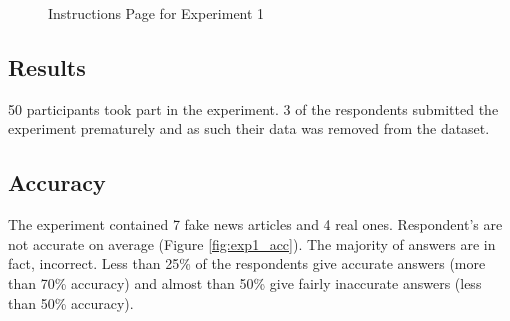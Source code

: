 \documentclass{report}
\theoremstyle{definition}
\begin{document}
\newpage
\thispagestyle{empty}
\begin{figure}[H]
    \centering
    \vspace*{-4.2cm}
    \caption{Instructions Page for Experiment 1}
    \label{fig:first_page}
\end{figure}



\subsection{Results}
50 participants took part in the experiment. 3 of the respondents submitted the experiment prematurely and as such their data was removed from the dataset.

\subsection{Accuracy}
The experiment contained 7 fake news articles and 4 real ones. Respondent's are not accurate on average (Figure \ref{fig:exp1_acc}). The majority of answers are in fact, incorrect. Less than 25\% of the respondents give accurate answers (more than 70\% accuracy) and almost than 50\% give fairly inaccurate answers (less than 50\% accuracy).
\end{document}
